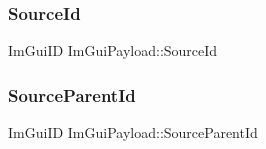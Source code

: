 \subsubsection{\texorpdfstring{Source\+Id}{SourceId}}
{\footnotesize\ttfamily Im\+Gui\+ID Im\+Gui\+Payload\+::\+Source\+Id}

\hypertarget{struct_im_gui_payload_a1757c714dd47f09b645a8eba2912849d}{}\label{struct_im_gui_payload_a1757c714dd47f09b645a8eba2912849d} 
\subsubsection{\texorpdfstring{Source\+Parent\+Id}{SourceParentId}}
{\footnotesize\ttfamily Im\+Gui\+ID Im\+Gui\+Payload\+::\+Source\+Parent\+Id}

